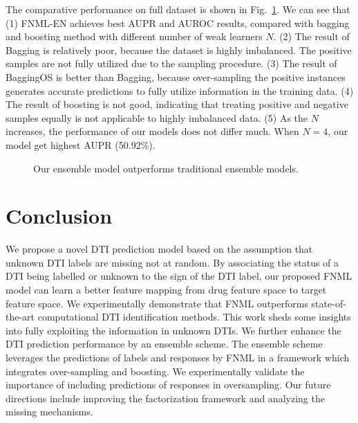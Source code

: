 \documentclass[conference]{IEEEtran}
\begin{document}
The comparative performance on full dataset is shown in Fig.~\ref{fig:ensemblecompare}. We can see that (1) FNML-EN achieves best AUPR and AUROC results, compared with bagging and boosting method with different number of weak learners $N$. (2) The result of Bagging is relatively poor, because the dataset is highly imbalanced. The positive samples are not fully utilized due to the sampling procedure. (3) The result of BaggingOS is better than Bagging, because over-sampling the positive instances generates accurate predictions to fully utilize information in the training data. (4) The result of boosting is not good, indicating that treating positive and negative samples equally is not applicable to highly imbalanced data. (5) As the $N$ increases, the performance of our models does not differ much. When $N=4$, our model get highest AUPR (50.92\%).
\begin{figure}[t]
\centering
{}
\vspace*{-10pt}
\caption{Our ensemble model outperforms traditional ensemble models.}\label{fig:ensemblecompare}
\end{figure}
\section{Conclusion}\label{sec:conclusion}

We propose a novel DTI prediction model based on the assumption that unknown DTI labels are missing not at random. By associating the status of a DTI being labelled or unknown to the sign of the DTI label, our proposed FNML model can learn a better feature mapping from drug feature space to target feature space. We experimentally demonstrate that FNML outperforms state-of-the-art computational DTI identification methods. This work sheds some insights into fully exploiting the information in unknown DTIs. We further enhance the DTI prediction performance by an ensemble scheme. The ensemble scheme leverages the predictions of labels and responses by FNML in a framework which integrates over-sampling and boosting. We experimentally validate the importance of including predictions of responses in oversampling. Our future directions include improving the factorization framework and analyzing the missing mechanisms. 
\end{document}
